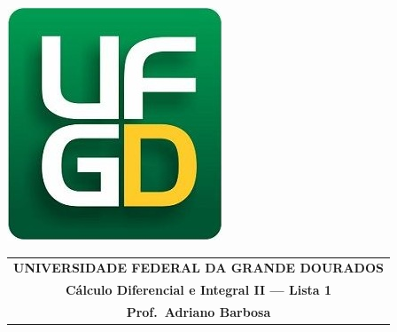 \documentclass[a4paper,5pt]{amsbook}
\begin{document}
\thispagestyle{empty}
\pagestyle{empty}
\begin{minipage}[h]{0.14\textwidth}
    \includegraphics[scale=0.24]{../../ufgd.png}
\end{minipage}
\begin{minipage}[h]{\textwidth}
    \begin{tabular}{c}
        {{\bf UNIVERSIDADE FEDERAL DA GRANDE DOURADOS}}\\
        {{\bf C\'{a}lculo Diferencial e Integral II --- Lista 1}}\\
        {{\bf Prof.\ Adriano Barbosa}}\\
    \end{tabular}
    \vspace{-0.45cm}
\end{minipage}

\end{document}
